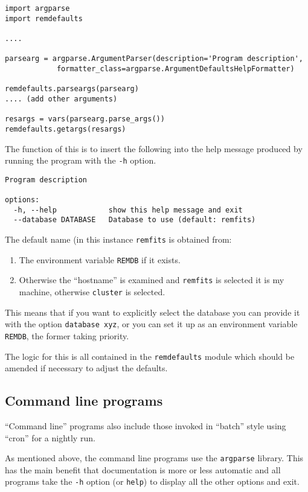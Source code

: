 \begin{verbatim}
import argparse
import remdefaults

....

parsearg = argparse.ArgumentParser(description='Program description',
            formatter_class=argparse.ArgumentDefaultsHelpFormatter)

remdefaults.parseargs(parsearg)
.... (add other arguments)

resargs = vars(parsearg.parse_args())
remdefaults.getargs(resargs)
\end{verbatim}

The function of this is to insert the following into the help message produced
by running the program with the \texttt{-h} option.

\begin{verbatim}
Program description

options:
  -h, --help            show this help message and exit
  --database DATABASE   Database to use (default: remfits)
\end{verbatim}

The default name (in this instance \texttt{remfits} is obtained from:

\begin{enumerate}
  \item The environment variable \texttt{REMDB} if it exists.
  \item Otherwise the ``hostname'' is examined and \texttt{remfits} is selected
  it is my machine, otherwise \texttt{cluster} is selected.
\end{enumerate}

This means that if you want to explicitly select the database you can provide it
with the option \texttt{\dmin database xyz}, or you can set it up as an environment
variable \texttt{REMDB}, the former taking priority.

The logic for this is all contained in the \texttt{remdefaults} module which
should be amended if necessary to adjust the defaults.

\subsection{Command line programs}
\protect\label{section:commandline}

``Command line'' programs also include those invoked in ``batch'' style using
``cron'' for a nightly run.

As mentioned above, the {\py} command line programs use the \texttt{argparse}
library. This has the main benefit that documentation is more or less automatic
and all programs take the \texttt{-h} option (or \texttt{\dmin help}) to display
all the other options and exit.

